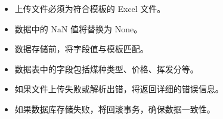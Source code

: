 \documentclass[a4paper,12pt,english]{sphinxmanual}
\begin{document}
\begin{fulllineitems}
\begin{description}
\begin{sphinxVerbatim}[commandchars=\\\{\}]

\end{sphinxVerbatim}

\begin{itemize}
\item {} 
\sphinxAtStartPar
上传文件必须为符合模板的 Excel 文件。

\item {} 
\sphinxAtStartPar
数据中的 NaN 值将替换为 None。

\item {} 
\sphinxAtStartPar
数据存储前，将字段值与模板匹配。

\item {} 
\sphinxAtStartPar
数据表中的字段包括煤种类型、价格、挥发分等。

\end{itemize}

\begin{itemize}
\item {} 
\sphinxAtStartPar
如果文件上传失败或解析出错，将返回详细的错误信息。

\item {} 
\sphinxAtStartPar
如果数据库存储失败，将回滚事务，确保数据一致性。

\end{itemize}

\end{description}

\end{fulllineitems}
\end{document}
